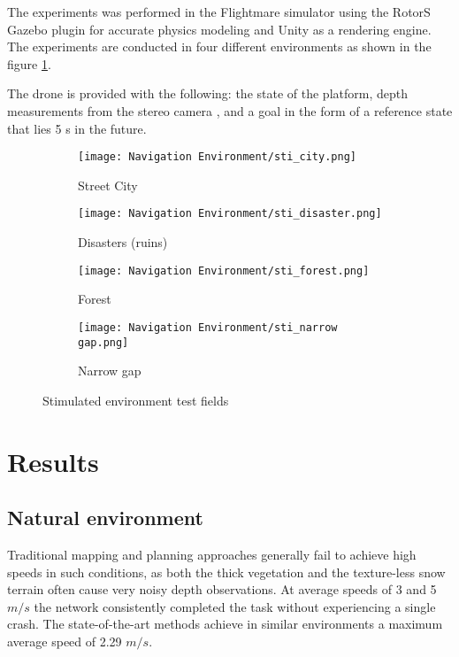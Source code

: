 The experiments was performed in the Flightmare simulator using the RotorS Gazebo plugin for accurate physics modeling and Unity as a rendering engine. The experiments are conducted in four different environments as shown in the figure \ref{fig:stimulated envt}. 

The drone is provided with the following: the state of the platform, depth measurements from the stereo camera \cite{stereoMatching}, and a goal in the form of a reference state that lies 5 s in the future. 

\begin{figure}[!h]
	\centering
	\begin{subfigure}[b]{0.48\textwidth}
		\centering
		\texttt{[image: Navigation Environment/sti\_city.png]}
		\caption{Street City}
	\end{subfigure}
	\hfill
	\begin{subfigure}[b]{0.48\textwidth}
		\centering
		\texttt{[image: Navigation Environment/sti\_disaster.png]}
		\caption{Disasters (ruins)}
	\end{subfigure}
	\hfill	
	\begin{subfigure}[b]{0.48\textwidth}
		\centering
		\texttt{[image: Navigation Environment/sti\_forest.png]}
		\caption{Forest}
	\end{subfigure}
	\hfill
	\begin{subfigure}[b]{0.48\textwidth}
		\centering
		\texttt{[image: Navigation Environment/sti\_narrow gap.png]}
		\caption{Narrow gap}
	\end{subfigure}
	
	\caption{Stimulated environment test fields}
	\label{fig:stimulated envt}
\end{figure}


\section{Results}

\subsection{Natural environment}
Traditional mapping and planning approaches generally fail to achieve high speeds in such conditions, as both the thick vegetation and the texture-less snow terrain often cause very noisy depth observations. At average speeds of 3 and 5 $m/s$ the network consistently completed the task without experiencing a single crash. The state-of-the-art methods achieve in similar environments a maximum average speed of 2.29 $m/s$.

